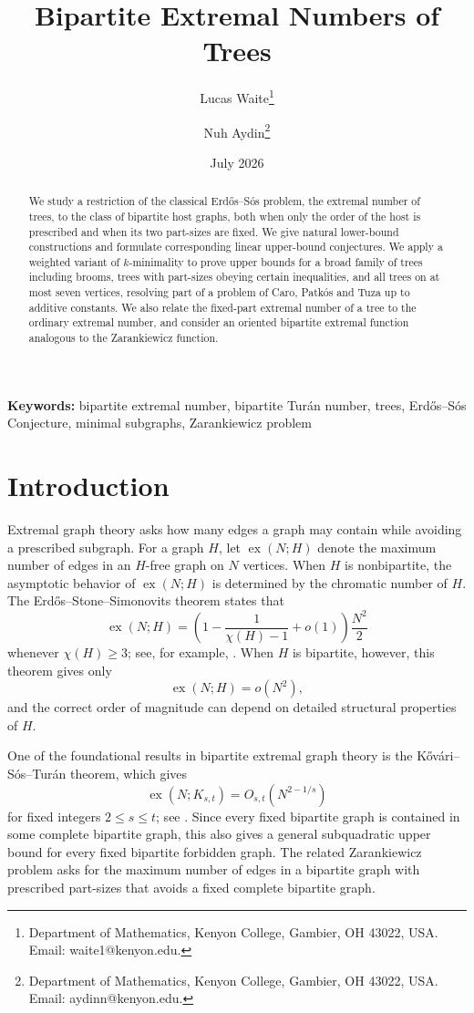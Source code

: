 \documentclass[12pt]{article}
\title{Bipartite Extremal Numbers of Trees}
\author{
Lucas Waite\thanks{
Department of Mathematics, Kenyon College, Gambier, OH 43022, USA.
Email: waite1@kenyon.edu.
}
\and
Nuh Aydin\thanks{
Department of Mathematics, Kenyon College, Gambier, OH 43022, USA.
Email: aydinn@kenyon.edu.
}
}
\date{July 2026}
\theoremstyle{definition}
\theoremstyle{remark}
\newcommand{\ex}{\operatorname{ex}}
\begin{document}
\maketitle

\begin{abstract}
We study a restriction of the classical Erd\H{o}s--S\'os problem, the extremal number of trees, to the class of bipartite host graphs, both when only the order of the host is prescribed and when its two part-sizes are fixed. We give natural lower-bound constructions and formulate corresponding linear upper-bound conjectures. We apply a weighted variant of $k$-minimality to prove upper bounds for a broad family of trees including brooms, trees with part-sizes obeying certain inequalities, and all trees on at most seven vertices, resolving part of a problem of Caro, Patk\'os and Tuza up to additive constants. We also relate the fixed-part extremal number of a tree to the ordinary extremal number, and consider an oriented bipartite extremal function analogous to the Zarankiewicz function.
\end{abstract}

\medskip
\noindent\textbf{Keywords:} bipartite extremal number, bipartite Tur\'an number, trees, Erd\H{o}s--S\'os Conjecture, minimal subgraphs, Zarankiewicz problem

\section{Introduction}

Extremal graph theory asks how many edges a graph may contain while avoiding a prescribed subgraph. For a graph $H$, let $\ex(N;H)$ denote the maximum number of edges in an $H$-free graph on $N$ vertices. When $H$ is nonbipartite, the asymptotic behavior of $\ex(N;H)$ is determined by the chromatic number of $H$. The Erd\H{o}s--Stone--Simonovits theorem states that
\[
\ex(N;H)=\left(1-\frac{1}{\chi(H)-1}+o(1)\right)\frac{N^2}{2}
\]
whenever $\chi(H)\geq 3$; see, for example,
\cite{erdosStone1946,simonovits1968}. When $H$ is bipartite, however, this theorem gives only
\[
\ex(N;H)=o(N^2),
\]
and the correct order of magnitude can depend on detailed structural properties of $H$.

One of the foundational results in bipartite extremal graph theory is the K\H{o}v\'ari--S\'os--Tur\'an theorem, which gives
\[
\ex(N;K_{s,t})=O_{s,t}\left(N^{2-1/s}\right)
\]
for fixed integers $2\leq s\leq t$; see \cite{kovari1954}. Since every fixed bipartite graph is contained in some complete bipartite graph, this also gives a general subquadratic upper bound for every fixed bipartite forbidden graph. The related Zarankiewicz problem asks for the maximum number of edges in a bipartite graph with prescribed part-sizes that avoids a fixed complete bipartite graph.
\end{document}
